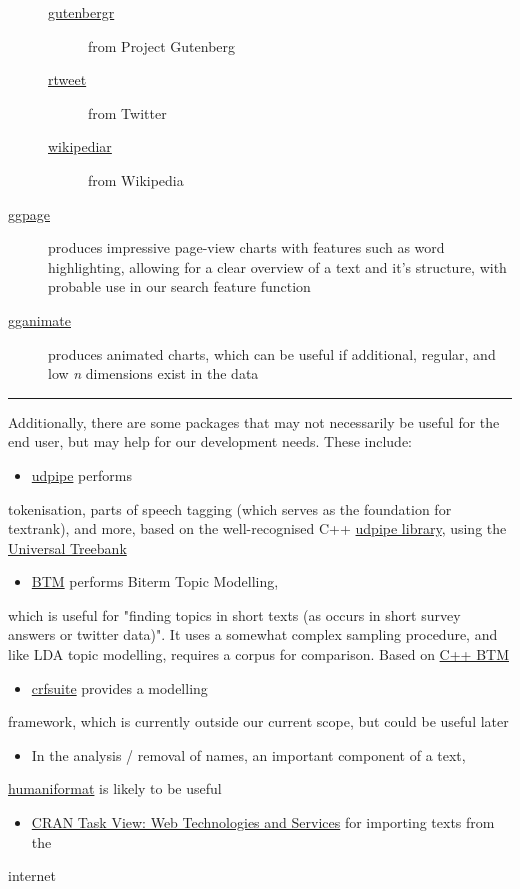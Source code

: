 \documentclass[11pt]{article}
\begin{document}
\begin{description}
\begin{description}
\item[{\href{https://cran.r-project.org/web/packages/gutenbergr/index.html}{gutenbergr}}] from Project Gutenberg
\item[{\href{https://rtweet.info/}{rtweet}}] from Twitter
\item[{\href{https://cran.r-project.org/web/packages/WikipediaR/index.html}{wikipediar}}] from Wikipedia
\end{description}

\item[{\href{https://github.com/EmilHvitfeldt/ggpage}{ggpage}}] produces impressive page-view charts with features such as
word highlighting, allowing for a clear overview of a text and
it's structure, with probable use in our search feature function

\item[{\href{https://github.com/thomasp85/gganimate}{gganimate}}] produces animated charts, which can be useful if
additional, regular, and low \emph{n} dimensions exist in the data
\end{description}

\noindent\rule{\textwidth}{0.5pt}

Additionally, there are some packages that may not necessarily be useful
for the end user, but may help for our development needs. These
include:
\begin{itemize}
\item \href{https://github.com/bnosac/udpipe}{udpipe} performs
\end{itemize}
tokenisation, parts of speech tagging (which serves as the foundation
for textrank), and more, based on the well-recognised C++
\href{http://ufal.mff.cuni.cz/udpipe}{udpipe library}, using the \href{https://universaldependencies.org}{Universal Treebank}
\begin{itemize}
\item \href{https://github.com/bnosac/BTM}{BTM} performs Biterm Topic Modelling,
\end{itemize}
which is useful for "finding topics in short texts (as occurs in short
survey answers or twitter data)". It uses a somewhat complex sampling
procedure, and like LDA topic modelling, requires a corpus for
comparison. Based on \href{https://github.com/xiaohuiyan/BTM}{C++ BTM} 
\begin{itemize}
\item \href{https://github.com/bnosac/crfsuite}{crfsuite} provides a modelling
\end{itemize}
framework, which is currently outside our current scope, but could be
useful later 
\begin{itemize}
\item In the analysis / removal of names, an important component of a text,
\end{itemize}
\href{https://github.com/ironholds/humaniformat/}{humaniformat} is likely to be useful
\begin{itemize}
\item \href{https://cran.r-project.org/web/views/WebTechnologies.html}{CRAN Task View: Web Technologies and Services} for importing texts from the
\end{itemize}
internet
\end{document}
